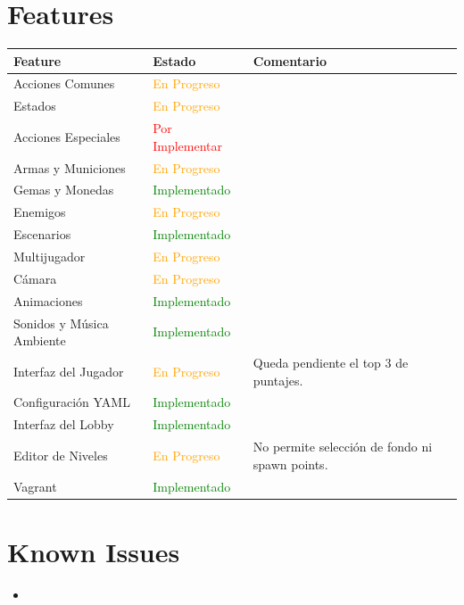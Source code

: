 \documentclass[titlepage,a4paper]{article}
\begin{document}
\section{Features}
\begin{tabular}{ | l | l | l | }
  \hline
  \textbf{Feature} & \textbf{Estado} & \textbf{Comentario} \\ \hline
  Acciones Comunes & \textcolor{orange}{En Progreso} & \\ \hline
  Estados & \textcolor{orange}{En Progreso} & \\ \hline
  Acciones Especiales & \textcolor{red}{Por Implementar} & \\ \hline
  Armas y Municiones & \textcolor{orange}{En Progreso} & \\ \hline
  Gemas y Monedas & \textcolor{green}{Implementado} & \\ \hline
  Enemigos & \textcolor{orange}{En Progreso} & \\ \hline
  Escenarios & \textcolor{green}{Implementado} & \\ \hline
  Multijugador & \textcolor{orange}{En Progreso} & \\ \hline
  Cámara & \textcolor{orange}{En Progreso} & \\ \hline
  Animaciones & \textcolor{green}{Implementado} & \\ \hline
  Sonidos y Música Ambiente & \textcolor{green}{Implementado} & \\ \hline
  Interfaz del Jugador & \textcolor{orange}{En Progreso} & Queda pendiente el top 3 de puntajes. \\ \hline
  Configuración YAML & \textcolor{green}{Implementado} & \\ \hline
  Interfaz del Lobby & \textcolor{green}{Implementado} & \\ \hline
  Editor de Niveles & \textcolor{orange}{En Progreso} & No permite selección de fondo ni spawn points. \\ \hline
  Vagrant & \textcolor{green}{Implementado} & \\ \hline
\end{tabular}

\section{Known Issues}
\begin{itemize}
  \item 
\end{itemize}
\end{document}
